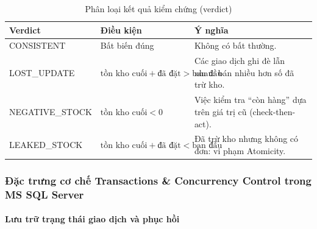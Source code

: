 \begin{table}[htbp]
\centering
\caption{Phân loại kết quả kiểm chứng (verdict)}
\label{tab:tx-verdict}
\renewcommand{\arraystretch}{1.25}
\begin{tabularx}{\textwidth}{>{\ttfamily}l l X}
\toprule
\normalfont\textbf{Verdict} & \textbf{Điều kiện} & \textbf{Ý nghĩa} \\
\midrule
CONSISTENT & Bất biến đúng & Không có bất thường. \\
LOST\_UPDATE & $\text{tồn kho cuối} + \text{đã đặt} > \text{ban đầu}$ & Các giao dịch ghi đè lẫn nhau: bán nhiều hơn số đã trừ kho. \\
NEGATIVE\_STOCK & $\text{tồn kho cuối} < 0$ & Việc kiểm tra ``còn hàng'' dựa trên giá trị cũ (check-then-act). \\
LEAKED\_STOCK & $\text{tồn kho cuối} + \text{đã đặt} < \text{ban đầu}$ & Đã trừ kho nhưng không có đơn: vi phạm Atomicity. \\
\bottomrule
\end{tabularx}
\end{table}

\subsubsection{Đặc trưng cơ chế Transactions \& Concurrency Control trong MS SQL Server}
\label{subsubsec:tx-mssql}

\paragraph{Lưu trữ trạng thái giao dịch và phục hồi}\mbox{}

